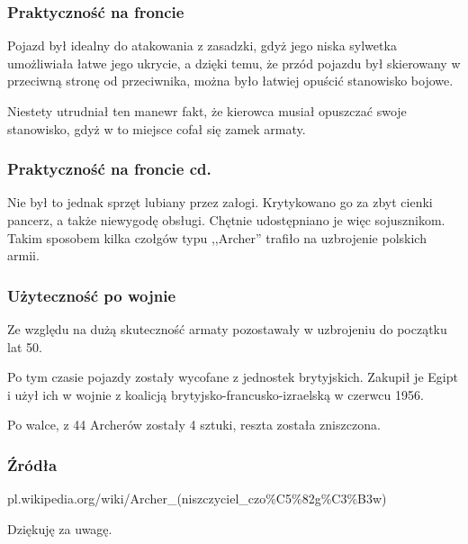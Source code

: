 \documentclass[]{beamer}
\begin{document}
\begin{frame}
\frametitle{Praktyczność na froncie}
Pojazd był idealny do atakowania z zasadzki, gdyż jego niska sylwetka umożliwiała łatwe jego ukrycie, a dzięki temu, że przód pojazdu był skierowany w przeciwną stronę od przeciwnika, można było łatwiej opuścić stanowisko bojowe.

Niestety utrudniał ten manewr fakt, że kierowca musiał opuszczać swoje stanowisko, gdyż w to miejsce cofał się zamek armaty.
\end{frame}

\begin{frame}
\frametitle[toc=]{Praktyczność na froncie cd.}
Nie był to jednak sprzęt lubiany przez załogi. Krytykowano go za zbyt cienki pancerz, a także niewygodę obsługi. Chętnie udostępniano je więc sojusznikom. Takim sposobem kilka czołgów typu ,,Archer'' trafiło na uzbrojenie polskich armii.
\end{frame}

\begin{frame}
\frametitle{Użyteczność po wojnie}
Ze względu na dużą skuteczność armaty pozostawały w uzbrojeniu do początku lat 50. \pause 

Po tym czasie pojazdy zostały wycofane z jednostek brytyjskich. Zakupił je Egipt i użył ich w wojnie z koalicją brytyjsko-francusko-izraelską w czerwcu 1956. \pause

Po walce, z 44 Archerów zostały 4 sztuki, reszta została zniszczona.
\end{frame}

\begin{frame}
\frametitle{Źródła}
pl.wikipedia.org/wiki/Archer\_(niszczyciel\_czo\%C5\%82g\%C3\%B3w)
\end{frame}
\begin{frame}
\begin{center}
Dziękuję za uwagę.
\end{center}
\end{frame}
\end{document}
